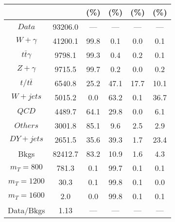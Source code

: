 \begin{figure}
\begin{minipage}[c]{0.32\textwidth}
{\begin{tabular}{cccccc}
 &  & (\%) & (\%) & (\%) & (\%)  \\
\hline
                                                                      $ Data $ &  93206.0 &  --- &  --- &  --- &  ---\\
$ W+\gamma $ &  41200.1 &  99.8 &  0.1 &  0.0 &  0.1\\
$ t\bar{t}\gamma $ &  9798.1 &  99.3 &  0.4 &  0.2 &  0.1\\
$ Z+\gamma $ &  9715.5 &  99.7 &  0.2 &  0.0 &  0.2\\
$ t/t\bar{t} $ &  6540.8 &  25.2 &  47.1 &  17.7 &  10.1\\
$ W+jets $ &  5015.2 &  0.0 &  63.2 &  0.1 &  36.7\\
$ QCD $ &  4489.7 &  64.1 &  29.8 &  0.0 &  6.1\\
$ Others $ &  3001.8 &  85.1 &  9.6 &  2.5 &  2.9\\
$ DY+jets $ &  2651.5 &  35.6 &  39.3 &  1.7 &  23.4\\
Bkgs &  82412.7 &  83.2 &  10.9 &  1.6 &  4.3\\
$ m_{T} = 800 $ &  781.3 &  0.1 &  99.7 &  0.1 &  0.1\\
$ m_{T} = 1200 $ &  30.3 &  0.1 &  99.8 &  0.1 &  0.0\\
$ m_{T} = 1600 $ &  2.0 &  0.0 &  99.8 &  0.1 &  0.1\\
Data/Bkgs &  1.13 &  --- &  --- &  --- &  ---\\
\hline
\end{tabular}
}
\end{minipage}
\end{figure}

